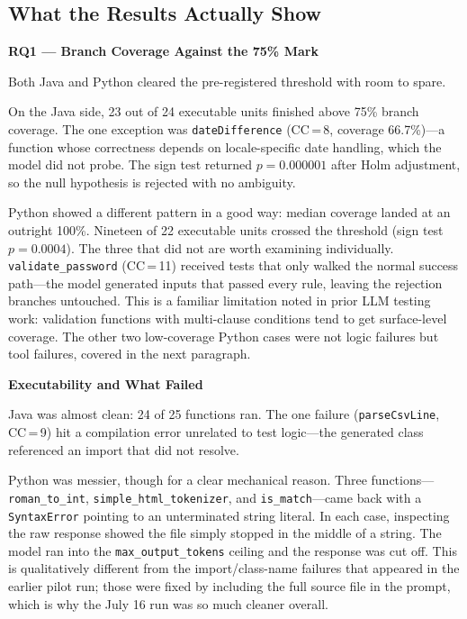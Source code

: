 \documentclass[conference]{IEEEtran}
\begin{document}
\subsection{What the Results Actually Show}
\label{sec:disc-findings}

\textbf{RQ1 --- Branch Coverage Against the 75\% Mark}

Both Java and Python cleared the pre-registered threshold with room to spare.

On the Java side, 23 out of 24 executable units finished above 75\% branch coverage. The one exception was \texttt{dateDifference} (CC\,=\,8, coverage 66.7\%)---a function whose correctness depends on locale-specific date handling, which the model did not probe. The sign test returned $p = 0.000001$ after Holm adjustment, so the null hypothesis is rejected with no ambiguity.

Python showed a different pattern in a good way: median coverage landed at an outright 100\%. Nineteen of 22 executable units crossed the threshold (sign test $p = 0.0004$). The three that did not are worth examining individually. \texttt{validate\_password} (CC\,=\,11) received tests that only walked the normal success path---the model generated inputs that passed every rule, leaving the rejection branches untouched. This is a familiar limitation noted in prior LLM testing work: validation functions with multi-clause conditions tend to get surface-level coverage. The other two low-coverage Python cases were not logic failures but tool failures, covered in the next paragraph.

\textbf{Executability and What Failed}

Java was almost clean: 24 of 25 functions ran. The one failure (\texttt{parseCsvLine}, CC\,=\,9) hit a compilation error unrelated to test logic---the generated class referenced an import that did not resolve.

Python was messier, though for a clear mechanical reason. Three functions---\texttt{roman\_to\_int}, \texttt{simple\_html\_tokenizer}, and \texttt{is\_match}---came back with a \texttt{SyntaxError} pointing to an unterminated string literal. In each case, inspecting the raw response showed the file simply stopped in the middle of a string. The model ran into the \texttt{max\_output\_tokens} ceiling and the response was cut off. This is qualitatively different from the import/class-name failures that appeared in the earlier pilot run; those were fixed by including the full source file in the prompt, which is why the July 16 run was so much cleaner overall.
\end{document}
